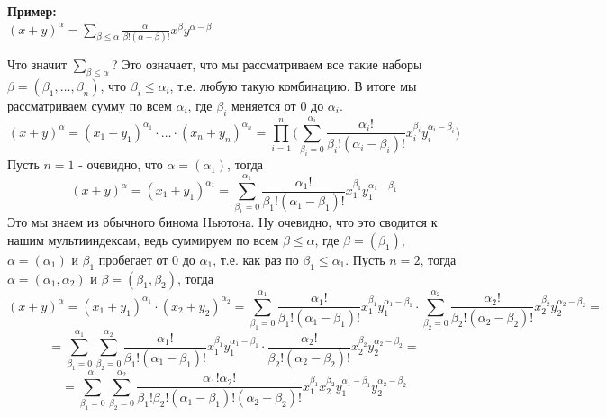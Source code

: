 \documentclass[book, 11pt]{report}
\begin{document}
        \par{\textbf{Пример: }\\
        $\displaystyle(x+y)^{\alpha}=\sum_{\beta\leq\alpha}\frac{\alpha!}{\beta!(\alpha-\beta)!}x^{\beta}y^{\alpha-\beta}$\\
        \par{Что значит $\displaystyle\sum_{\beta\leq\alpha}$? Это означает, что мы рассматриваем все такие наборы $\beta=(\beta_1,\ldots,\beta_n)$, что $\beta_i\leq\alpha_i$, т.е. любую такую комбинацию. В итоге мы рассматриваем сумму по всем $\alpha_i$, где $\beta_i$ меняется от $0$ до $\alpha_i$.}
        \begin{equation*}
            (x+y)^{\alpha}=(x_1+y_1)^{\alpha_1}\cdot\ldots\cdot(x_n+y_n)^{\alpha_n}=\prod_{i=1}^n\bigg(\sum_{\beta_i=0}^{\alpha_i}\frac{\alpha_i!}{\beta_i!(\alpha_i-\beta_i)!}x_i^{\beta_i}y_i^{\alpha_i-\beta_i}\bigg)
        \end{equation*}
        Пусть $n=1$ - очевидно, что $\alpha=(\alpha_1)$, тогда
        \begin{equation*}
            (x+y)^{\alpha}=(x_1+y_1)^{\alpha_1}=\sum_{\beta_1=0}^{\alpha_1}\frac{\alpha_1!}{\beta_1!(\alpha_1-\beta_1)!}x_1^{\beta_1}y_1^{\alpha_1-\beta_1}
        \end{equation*}
        Это мы знаем из обычного бинома Ньютона. Ну очевидно, что это сводится к нашим мультииндексам, ведь суммируем по всем $\beta\leq\alpha$, где $\beta=(\beta_1)$, $\alpha=(\alpha_1)$ и $\beta_1$ пробегает от 0 до $\alpha_1$, т.е. как раз по $\beta_1\leq\alpha_1$.
        Пусть $n=2$, тогда $\alpha=(\alpha_1,\alpha_2)$ и $\beta=(\beta_1,\beta_2)$, тогда
        \begin{equation*}
            (x+y)^{\alpha}=(x_1+y_1)^{\alpha_1}\cdot(x_2+y_2)^{\alpha_2}=\sum_{\beta_1=0}^{\alpha_1}\frac{\alpha_1!}{\beta_1!(\alpha_1-\beta_1)!}x_1^{\beta_1}y_1^{\alpha_1-\beta_1}\cdot\sum_{\beta_2=0}^{\alpha_2}\frac{\alpha_2!}{\beta_2!(\alpha_2-\beta_2)!}x_2^{\beta_2}y_2^{\alpha_2-\beta_2}=
        \end{equation*}
        \begin{equation*}
            =\sum_{\beta_1=0}^{\alpha_1}\sum_{\beta_2=0}^{\alpha_2}\frac{\alpha_1!}{\beta_1!(\alpha_1-\beta_1)!}x_1^{\beta_1}y_1^{\alpha_1-\beta_1}\cdot\frac{\alpha_2!}{\beta_2!(\alpha_2-\beta_2)!}x_2^{\beta_2}y_2^{\alpha_2-\beta_2}=
        \end{equation*}
        \begin{equation*}
            =\sum_{\beta_1=0}^{\alpha_1}\sum_{\beta_2=0}^{\alpha_2}\frac{\alpha_1!\alpha_2!}{\beta_1!\beta_2!(\alpha_1-\beta_1)!(\alpha_2-\beta_2)!}x_1^{\beta_1}x_2^{\beta_2}y_1^{\alpha_1-\beta_1}y_2^{\alpha_2-\beta_2}

\end{equation*}}
\end{document}
